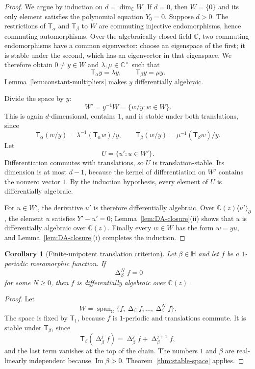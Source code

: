 \documentclass[11pt]{article}
\numberwithin{equation}{section}
\newtheorem{corollary}[theorem]{Corollary}
\theoremstyle{definition}
\theoremstyle{remark}
\newcommand{\C}{\mathbb C}
\newcommand{\HH}{\mathbb H}
\newcommand{\Span}{\operatorname{span}}
\newcommand{\T}{\mathsf T}
\newcommand{\Deltaop}{\mathop{\Delta}}
\begin{document}
\begin{proof}
We argue by induction on $d=\dim_\C W$.  If $d=0$, then $W=\{0\}$ and its
only element satisfies the polynomial equation $Y_0=0$.  Suppose $d>0$.
The restrictions of $\T_\alpha$ and $\T_\beta$ to
$W$ are commuting injective endomorphisms, hence commuting automorphisms.
Over the algebraically closed field $\C$, two commuting endomorphisms have a
common eigenvector: choose an eigenspace of the first; it is stable under the
second, which has an eigenvector in that eigenspace.  We therefore obtain
$0\neq y\in W$ and $\lambda,\mu\in\C^\times$ such that
\[
 \T_\alpha y=\lambda y,
 \qquad \T_\beta y=\mu y.
\]
Lemma~\ref{lem:constant-multipliers} makes $y$ differentially algebraic.

Divide the space by $y$:
\[
 W'=y^{-1}W=\{w/y:w\in W\}.
\]
This is again $d$-dimensional, contains $1$, and is stable under both
translations, since
\[
 \T_\alpha(w/y)=\lambda^{-1}(\T_\alpha w)/y,
 \qquad
 \T_\beta(w/y)=\mu^{-1}(\T_\beta w)/y.
\]
Let
\[
 U=\{u':u\in W'\}.
\]
Differentiation commutes with translations, so $U$ is translation-stable.
Its dimension is at most $d-1$, because the kernel of differentiation on
$W'$ contains the nonzero vector $1$.  By the induction hypothesis, every
element of $U$ is differentially algebraic.

For $u\in W'$, the derivative $u'$ is therefore differentially algebraic.
Over $\C(z)\langle u'\rangle_\partial$, the element $u$ satisfies
$Y'-u'=0$; Lemma~\ref{lem:DA-closure}(ii) shows that $u$ is differentially
algebraic over $\C(z)$.  Finally every $w\in W$ has the form $w=yu$, and
Lemma~\ref{lem:DA-closure}(i) completes the induction.
\end{proof}

\begin{corollary}[Finite-unipotent translation criterion]
\label{cor:unipotent}
Let $\beta\in\HH$ and let $f$ be a $1$-periodic meromorphic function.  If
\begin{equation}
 \Deltaop_\beta^N f=0
 \label{eq:unipotent-hyp}
\end{equation}
for some $N\geq0$, then $f$ is differentially algebraic over $\C(z)$.
\end{corollary}

\begin{proof}
Let
\[
 W=\Span_\C\{f,\Deltaop_\beta f,\ldots,
 \Deltaop_\beta^Nf\}.
\]
The space is fixed by $\T_1$, because $f$ is $1$-periodic and translations
commute.  It is stable under $\T_\beta$, since
\[
 \T_\beta(\Deltaop_\beta^jf)
 =\Deltaop_\beta^jf+\Deltaop_\beta^{j+1}f,
\]
and the last term vanishes at the top of the chain.  The numbers $1$ and
$\beta$ are real-linearly independent because $\operatorname{Im}\beta>0$.
Theorem~\ref{thm:stable-space} applies.
\end{proof}
\end{document}
